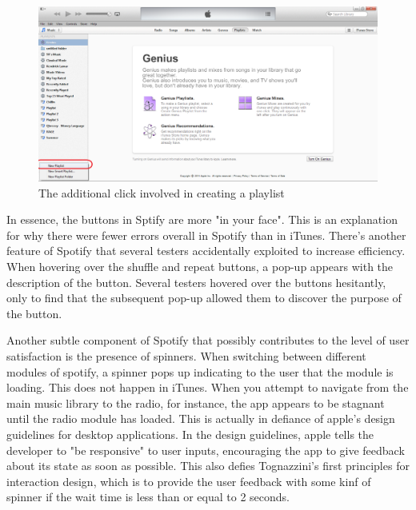 \documentclass[12pt]{report}
\begin{document}
\begin{figure}[H]
	\centering
	\includegraphics[width=.75\textwidth]{chart9.png}
	\caption{The additional click involved in creating a playlist}
\end{figure}


 In essence, the buttons in Sptify are more "in your face". This is an explanation for why there were fewer errors overall in Spotify than in iTunes. There's another feature of Spotify that several testers accidentally exploited to increase efficiency. When hovering over the shuffle and repeat buttons, a pop-up appears with the description of the button. Several testers hovered over the buttons hesitantly, only to find that the subsequent pop-up allowed them to discover the purpose of the button.

Another subtle component of Spotify that possibly contributes to the level of user satisfaction is the presence of spinners. When switching between different modules of spotify, a spinner pops up indicating to the user that the module is loading. This does not happen in iTunes. When you attempt to navigate from the main music library to the radio, for instance, the app appears to be stagnant until the radio module has loaded. This is actually in defiance of apple's design guidelines  for desktop applications. In the design guidelines, apple tells the developer to  "be responsive" to user inputs, encouraging the app to give feedback about its state as soon as possible. This also defies Tognazzini's first principles for interaction design, which is to provide the user feedback with some kinf of spinner if the wait time is less than or equal to 2 seconds.
\end{document}
